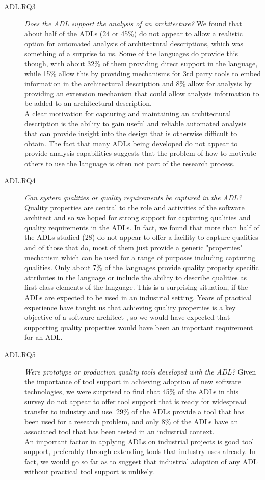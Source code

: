 \begin{description}
\item[ADL.RQ3] \emph{Does the ADL support the analysis of an architecture?}
We found that about half of the ADLs (24 or 45\%) do not appear to allow a realistic option for automated analysis of architectural descriptions, which was something of a surprise to us.  Some of the languages do provide this though, with about 32\% of them providing direct support in the language, while 15\% allow this by providing mechanisms for 3rd party tools to embed information in the architectural description and 8\% allow for analysis by providing an extension mechanism that could allow analysis information to be added to an architectural description. \\
A clear motivation for capturing and maintaining an architectural description is the ability to gain useful and reliable automated analysis that can provide insight into the design that is otherwise difficult to obtain.  The fact that many ADLs being developed do not appear to provide analysis capabilities suggests that the problem of how to motivate others to use the language is often not part of the research process.

\item[ADL.RQ4] \emph{Can system qualities or quality requirements be captured in the ADL?}
Quality properties are central to the role and activities of the software architect and so we hoped for strong support for capturing qualities and quality requirements in the ADLs.  In fact, we found that more than half of the ADLs studied (28) do not appear to offer a facility to capture qualities and of those that do, most of them just provide a generic "properties" mechanism which can be used for a range of purposes including capturing qualities.  Only about 7\% of the languages provide quality property specific attributes in the language or include the ability to describe qualities as first class elements of the language.  This is a surprising situation, if the ADLs are expected to be used in an industrial setting.  Years of practical experience have taught us that achieving quality properties is a key objective of a software architect \cite{brown2018-sad, rozanski2011-ssa2e}, so we would have expected that supporting quality properties would have been an important requirement for an ADL.

\item[ADL.RQ5] \emph{Were prototype or production quality tools developed with the ADL?}
Given the importance of tool support in achieving adoption of new software technologies, we were surprised to find that 45\% of the ADLs in this survey do not appear to offer tool support that is ready for widespread transfer to industry and use.  29\% of the ADLs provide a tool that has been used for a research problem, and only 8\% of the ADLs have an associated tool that has been tested in an industrial context.\\
An important factor in applying ADLs on industrial projects is good tool support, preferably through extending tools that industry uses already.  In fact, we would go so far as to suggest that industrial adoption of any ADL without practical tool support is unlikely.


\end{description}
